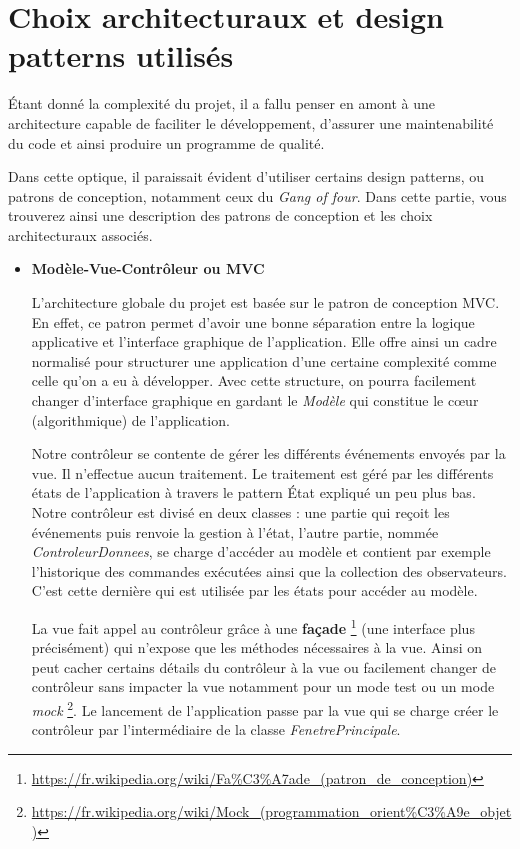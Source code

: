 \documentclass[10pt,a4paper]{book}
\begin{document}
\section{Choix architecturaux et design patterns utilisés}
Étant donné la complexité du projet, il a fallu penser en amont à une architecture capable de faciliter le développement, d'assurer une maintenabilité du code et ainsi produire un programme de qualité. 

Dans cette optique, il paraissait évident d'utiliser certains design patterns, ou patrons de conception, notamment ceux du \textit{Gang of four}. Dans cette partie, vous trouverez ainsi une description des patrons de conception et les choix architecturaux associés.
\begin{itemize}

\item \textbf{Modèle-Vue-Contrôleur ou MVC}

L'architecture globale du projet est basée sur le patron de conception MVC. En effet, ce patron permet d'avoir une bonne séparation entre la logique applicative et l'interface graphique de l'application. Elle offre ainsi un cadre normalisé pour structurer une application d'une certaine complexité comme celle qu'on a eu à développer. Avec cette structure, on pourra facilement changer d'interface graphique en gardant le \textit{Modèle} qui constitue le cœur (algorithmique) de l'application.

Notre contrôleur se contente de gérer les différents événements envoyés par la vue. Il n'effectue aucun traitement. Le traitement est géré par les différents états de l'application à travers le pattern État expliqué un peu plus bas. Notre contrôleur est divisé en deux classes : une partie qui reçoit les événements puis renvoie la gestion à l'état, l'autre partie, nommée \textit{ControleurDonnees}, se charge d’accéder au modèle et contient par exemple l'historique des commandes exécutées ainsi que la collection des observateurs. C'est cette dernière qui est utilisée par les états pour accéder au modèle.

La vue fait appel au contrôleur grâce à une \textbf{façade} \footnote{\url{https://fr.wikipedia.org/wiki/Fa\%C3\%A7ade\_(patron\_de\_conception)}} (une interface plus précisément) qui n'expose que les méthodes nécessaires à la vue. Ainsi on peut cacher certains détails du contrôleur à la vue ou facilement changer de contrôleur sans impacter la vue notamment pour un mode test ou un mode \textit{mock} \footnote{\url{https://fr.wikipedia.org/wiki/Mock\_(programmation\_orient\%C3\%A9e\_objet)}}.
Le lancement de l'application passe par la vue qui se charge créer le contrôleur par l’intermédiaire de la classe \textit{FenetrePrincipale}.


\end{itemize}
\end{document}
